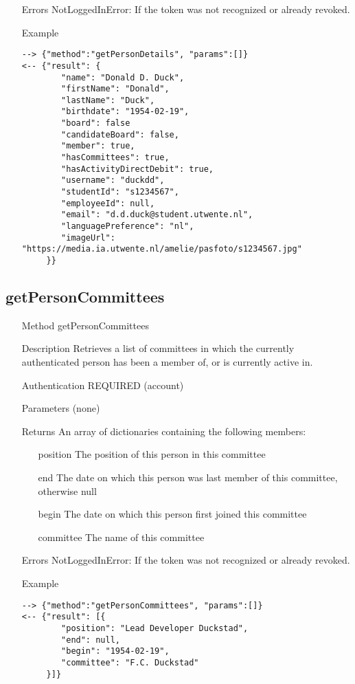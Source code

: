 \documentclass[a4paper]{scrreprt}
\begin{document}
\begin{enumerate}
\item[Errors] NotLoggedInError: If the token was not recognized or already revoked.
\item[Example]
\begin{lstlisting}
--> {"method":"getPersonDetails", "params":[]}
<-- {"result": {
        "name": "Donald D. Duck",
        "firstName": "Donald",
        "lastName": "Duck",
        "birthdate": "1954-02-19",
        "board": false
        "candidateBoard": false,
        "member": true,
        "hasCommittees": true,
        "hasActivityDirectDebit": true,
        "username": "duckdd",
        "studentId": "s1234567",
        "employeeId": null,
        "email": "d.d.duck@student.utwente.nl",
        "languagePreference": "nl",
        "imageUrl": "https://media.ia.utwente.nl/amelie/pasfoto/s1234567.jpg"
     }}
\end{lstlisting}
\end{enumerate}

\subsection{getPersonCommittees}
\begin{enumerate}
\item[Method] getPersonCommittees
\item[Description] Retrieves a list of committees in which the currently authenticated person has been a member of, or is currently active in.
\item[Authentication] REQUIRED (account)
\item[Parameters] (none)
\item[Returns] An array of dictionaries containing the following members:
\begin{enumerate}
	\item[position] The position of this person in this committee
    \item[end] The date on which this person was last member of this committee, otherwise null
    \item[begin] The date on which this person first joined this committee
    \item[committee] The name of this committee
    \end{enumerate}
\item[Errors] NotLoggedInError: If the token was not recognized or already revoked.
\item[Example]
\begin{lstlisting}
--> {"method":"getPersonCommittees", "params":[]}
<-- {"result": [{
        "position": "Lead Developer Duckstad",
        "end": null,
        "begin": "1954-02-19",
        "committee": "F.C. Duckstad"
     }]}
\end{lstlisting}
\end{enumerate}
\end{document}

